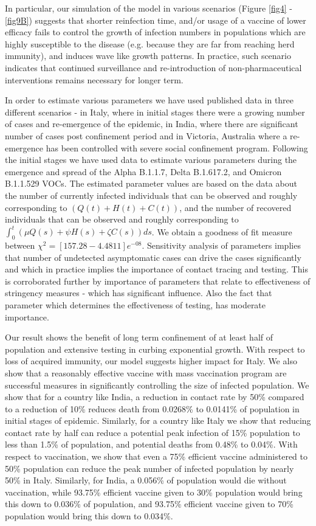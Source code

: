 \documentclass[10pt]{wlscirep}
\begin{document}
In particular, our simulation of the model in various scenarios (Figure \ref{fig4} - \ref{fig9B}) suggests that shorter reinfection time, and/or usage of a vaccine of lower efficacy fails to control the growth of infection numbers in populations which are highly susceptible to the disease (e.g. because they are far from reaching herd immunity), and induces wave like growth patterns. In practice, such scenario indicates that continued surveillance and re-introduction of non-pharmaceutical interventions remains necessary for longer term.

In order to estimate various parameters we have used  published data in three different scenarios - in Italy, where in initial stages there were a growing number of cases and re-emergence of the epidemic, in India, where there are significant number of cases post confinement period and in Victoria, Australia where a re-emergence has been controlled with severe social confinement program. Following the initial stages we have used data to estimate various parameters during the emergence and spread of the Alpha B.1.1.7, Delta B.1.617.2, and Omicron B.1.1.529 VOCs. The estimated parameter values are based on the data about the number of currently infected individuals that can be observed and roughly corresponding to $\left( Q(t) + H(t) + C(t)\right) $, and the number of recovered individuals that can be observed and roughly corresponding to $\int_{0}^{t}{\left( \mu Q(s) + \psi H(s) + \zeta  C(s) \right) ds}$. We obtain a goodness of fit measure between $\chi^2=[157.28-4.4811]e^{-08}$. Sensitivity analysis of parameters implies  that number of undetected asymptomatic cases can drive the cases significantly and which in practice implies the importance of contact tracing and testing. This is corroborated further by importance of parameters that relate to effectiveness of stringency measures - which has significant influence. Also the fact that parameter which determines the effectiveness of testing, has moderate importance. 

Our result shows the benefit of long term confinement of at least half of population and extensive testing in curbing exponential growth. With respect to loss of acquired immunity, our model suggests higher impact for Italy. We also show that a reasonably effective vaccine with mass vaccination program  are successful measures in significantly controlling the size of infected population. We show that for a country like India, a reduction in contact rate by 50\% compared to a reduction of 10\% reduces death from 0.0268\% to 0.0141\% of population in initial stages of epidemic. Similarly, for a country like Italy we show that reducing contact rate by half can reduce a potential peak infection of 15\% population to less than 1.5\% of population, and potential deaths from 0.48\% to 0.04\%. With respect to vaccination, we show that even a 75\% efficient vaccine administered to 50\% population can reduce the peak number of infected population by nearly 50\% in Italy. Similarly, for India, a 0.056\% of population would die without vaccination, while 93.75\% efficient vaccine given to 30\% population would bring this down to 0.036\% of population, and 93.75\% efficient vaccine given to 70\% population would bring this down to 0.034\%.
\end{document}
